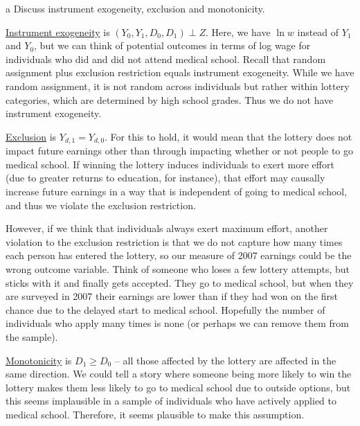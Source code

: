 \documentclass{article}
\begin{document}
\begin{problem}{a}
Discuss instrument exogeneity, exclusion and monotonicity.
\end{problem}
\begin{solution}
\underline{Instrument exogeneity} is $(Y_0,Y_1,D_0,D_1) \perp Z$. Here, we have $\ln w$ instead of $Y_1$ and $Y_0$, but we can think of potential outcomes in terms of log wage for individuals who did and did not attend medical school. Recall that random assignment plus exclusion restriction equals instrument exogeneity. While we have random assignment, it is not random across individuals but rather within lottery categories, which are determined by high school grades. Thus we do not have instrument exogeneity.

\underline{Exclusion} is $Y_{d,1}=Y_{d,0}$. For this to hold, it would mean that the lottery does not impact future earnings other than through impacting whether or not people to go medical school. If winning the lottery induces individuals to exert more effort (due to greater returns to education, for instance), that effort may causally increase future earnings in a way that is independent of going to medical school, and thus we violate the exclusion restriction. 

However, if we think that individuals always exert maximum effort, another violation to the exclusion restriction is that we do not capture how many times each person has entered the lottery, so our measure of 2007 earnings could be the wrong outcome variable. Think of someone who loses a few lottery attempts, but sticks with it and finally gets accepted. They go to medical school, but when they are surveyed in 2007 their earnings are lower than if they had won on the first chance due to the delayed start to medical school. Hopefully the number of individuals who apply many times is none (or perhaps we can remove them from the sample).

\underline{Monotonicity} is $D_1 \geq D_0$ -- all those affected by the lottery are affected in the same direction. We could tell a story where someone being more likely to win the lottery makes them less likely to go to medical school due to outside options, but this seems implausible in a sample of individuals who have actively applied to medical school. Therefore, it seems plausible to make this assumption.

\end{solution}
\end{document}
